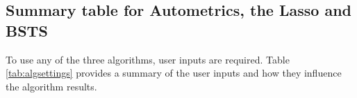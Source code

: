 


\subsection{Summary table for Autometrics, the Lasso and BSTS} 
To use any of the three algorithms, user inputs are required. Table \ref{tab:algsettings} provides a summary of the user inputs and how they influence the algorithm results.


